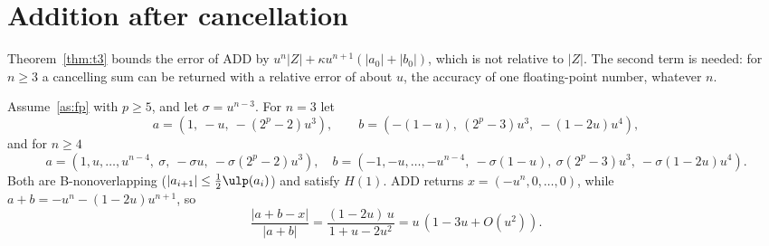 
\section{Addition after cancellation}\label{sec:cancel}

Theorem~\ref{thm:t3} bounds the error of ADD by $u^n|Z| + \kappa u^{n+1}(|a_0| + |b_0|)$, which is not relative to
$|Z|$. The second term is needed: for $n \ge 3$ a cancelling sum can be returned with a relative error of about $u$,
the accuracy of one floating-point number, whatever $n$.

\begin{proposition}\label{prop:cancel}
Assume~\ref{as:fp} with $p \ge 5$, and let $\sigma = u^{n-3}$. For $n = 3$ let
\[
a = (1,\ -u,\ -(2^p - 2)u^3), \qquad b = (-(1-u),\ (2^p - 3)u^3,\ -(1 - 2u)u^4),
\]
and for $n \ge 4$
\[
a = (1, u, \dots, u^{n-4},\ \sigma,\ -\sigma u,\ -\sigma(2^p - 2)u^3), \quad
b = (-1, -u, \dots, -u^{n-4},\ -\sigma(1-u),\ \sigma(2^p - 3)u^3,\ -\sigma(1 - 2u)u^4).
\]
Both are B-nonoverlapping ($|a_{i+1}| \le \frac12\ulp(a_i)$) and satisfy $H(1)$. ADD returns $x = (-u^n, 0, \dots, 0)$,
while $a + b = -u^n - (1 - 2u)u^{n+1}$, so
\[
\frac{|a + b - x|}{|a + b|} = \frac{(1 - 2u)\,u}{1 + u - 2u^2} = u\,(1 - 3u + O(u^2)).
\]
\end{proposition}

